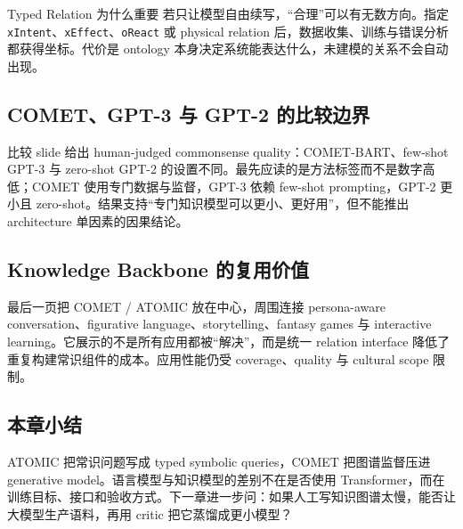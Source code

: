 
\begin{knowledgebox}{Typed Relation 为什么重要}
若只让模型自由续写，“合理”可以有无数方向。指定 \texttt{xIntent}、\texttt{xEffect}、\texttt{oReact} 或 physical relation 后，数据收集、训练与错误分析都获得坐标。代价是 ontology 本身决定系统能表达什么，未建模的关系不会自动出现。
\end{knowledgebox}

\subsection{COMET、GPT-3 与 GPT-2 的比较边界}

比较 slide 给出 human-judged commonsense quality：COMET-BART、few-shot GPT-3 与 zero-shot GPT-2 的设置不同。最先应读的是方法标签而不是数字高低；COMET 使用专门数据与监督，GPT-3 依赖 few-shot prompting，GPT-2 更小且 zero-shot。结果支持“专门知识模型可以更小、更好用”，但不能推出 architecture 单因素的因果结论。



\subsection{Knowledge Backbone 的复用价值}

最后一页把 COMET / ATOMIC 放在中心，周围连接 persona-aware conversation、figurative language、storytelling、fantasy games 与 interactive learning。它展示的不是所有应用都被“解决”，而是统一 relation interface 降低了重复构建常识组件的成本。应用性能仍受 coverage、quality 与 cultural scope 限制。


\subsection{本章小结}

ATOMIC 把常识问题写成 typed symbolic queries，COMET 把图谱监督压进 generative model。语言模型与知识模型的差别不在是否使用 Transformer，而在训练目标、接口和验收方式。下一章进一步问：如果人工写知识图谱太慢，能否让大模型生产语料，再用 critic 把它蒸馏成更小模型？


